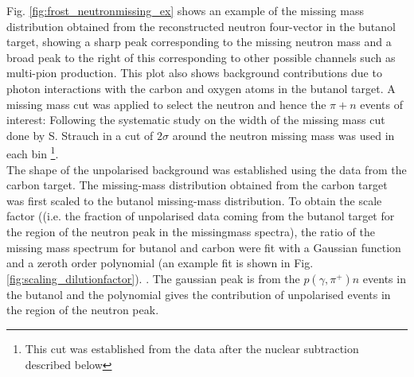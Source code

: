 Fig. \ref{fig:frost_neutronmissing_ex} shows an example of the missing mass distribution obtained from the reconstructed neutron four-vector in the butanol target, showing a sharp peak corresponding to the missing neutron mass and a broad peak to the right of this corresponding to other possible channels such as multi-pion production. This plot also shows background contributions due to photon interactions with the carbon and oxygen atoms in the butanol target.
A missing mass cut was applied to select the neutron and hence the $\pi + n$ events of interest: Following the systematic study on the width of the missing mass cut done by S. Strauch in \cite{Strauch_2014} a cut of $2 \sigma$ around the neutron missing mass was used in each bin \footnote{This cut was established from the data after the nuclear subtraction described below}. \\
The shape of the unpolarised background was established using the data from the carbon target. 
 The missing-mass distribution obtained from the carbon target was first scaled to the butanol missing-mass distribution. To obtain the scale factor ((i.e. the fraction of unpolarised data coming from the butanol target for the region of the neutron peak in the missingmass spectra), the ratio of the  missing mass spectrum for butanol and carbon were fit with a Gaussian function and a zeroth order polynomial (an example fit  is shown in Fig. \ref{fig:scaling_dilutionfactor}). . The gaussian peak is from the $p(\gamma,\pi^+)n$ events in the butanol and the polynomial gives the contribution of unpolarised events in the region of the neutron peak. \\
 
